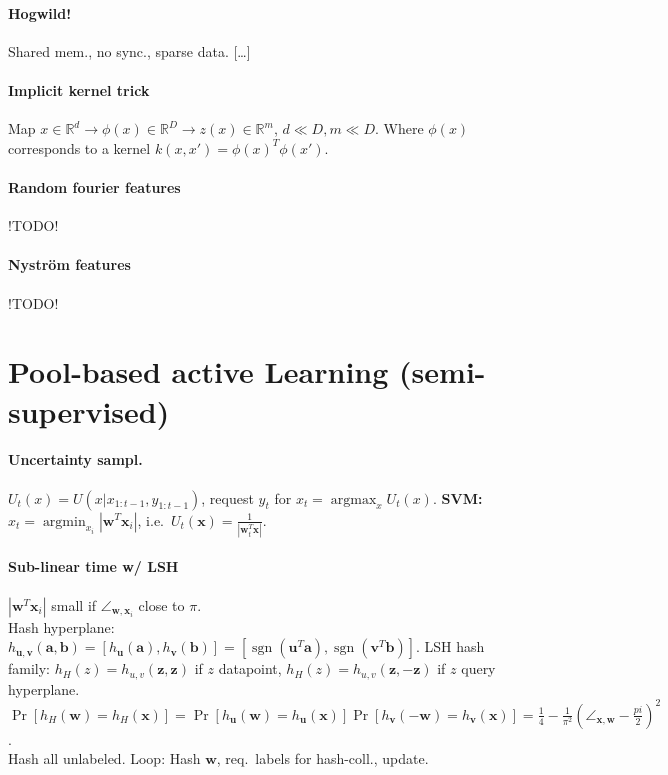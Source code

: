 \documentclass[9pt]{scrartcl}
\DeclareMathOperator{\sign}{sgn}
\DeclareMathOperator{\argmin}{argmin}
\DeclareMathOperator{\argmax}{argmax}
\newcommand{\R}{\mathbb{R}}
\begin{document}
\begin{twocolumn}
\paragraph{Hogwild!}
Shared mem., no sync., sparse data. [\dots]

\paragraph{Implicit kernel trick}
Map $x \in \R^d \rightarrow \phi(x) \in \R^D \rightarrow z(x) \in \R^m$, $d \ll D, m \ll D$.
Where $\phi(x)$ corresponds to a kernel $k(x,x') = \phi(x)^T\phi(x')$.

\paragraph{Random fourier features}
!TODO!
\paragraph{Nyström features}
!TODO!

\section{Pool-based active Learning (semi-supervised)}

\paragraph{Uncertainty sampl.}
$U_t(x) = U(x | x_{1:t-1}, y_{1:t-1})$, request $y_t$ for $x_t = \argmax_x U_t(x)$.
\textbf{SVM:} $x_t = \argmin_{x_i}|\bm w^T\bm x_i|$, i.e.\ $U_t(\bm x) = \frac{1}{|\bm w_t^T \bm x|}$.

\paragraph{Sub-linear time w/ LSH}
$|\bm w^T\bm x_i|$ small if $\angle_{\bm w,\bm x_i}$ close to $\pi$.\\
Hash hyperplane:
$h_{\bm u,\bm v}(\bm a,\bm b) = [h_{\bm u}(\bm a), h_{\bm v}(\bm b)] = [\sign(\bm u^T\bm a),\sign(\bm v^T\bm b)]$.
LSH hash family: $h_H(z) = h_{u,v}(\bm z,\bm z)$ if $z$ datapoint, $h_H(z) = h_{u,v}(\bm z,-\bm z)$ if $z$ query hyperplane.
$\Pr[h_H(\bm w) = h_H(\bm x)] = \Pr[h_{\bm u}(\bm w) = h_{\bm u}(\bm x)]\Pr[h_{\bm v}(-\bm w) = h_{\bm v}(\bm x)] = \frac{1}{4} - \frac{1}{\pi^2}(\angle_{\bm x,\bm w} - \frac{pi}{2})^2$.\\
Hash all unlabeled. Loop: Hash $\bm w$, req.\ labels for hash-coll., update.


\end{twocolumn}
\end{document}
